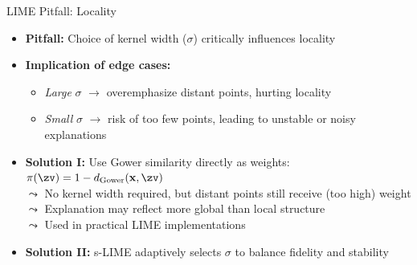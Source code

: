 \documentclass[10pt,compress,t,notes=noshow, xcolor=table]{beamer}
\begin{document}
\begin{frame}{LIME Pitfall: Locality }

\begin{itemize}
  \item \textbf{Pitfall:} Choice of kernel width (\(\sigma\)) critically influences locality
  \pause
  \item \textbf{Implication of edge cases:}
  \begin{itemize}
    \item \emph{Large} $\sigma$ $\rightarrow$ overemphasize distant points, hurting locality
    \item \emph{Small} $\sigma$ $\rightarrow$ risk of too few points, leading to unstable or noisy explanations
  \end{itemize}
  \pause
  \item  \textbf{Solution I:} Use Gower similarity directly as weights: \( \pi(\zv) = 1 - d_{\text{Gower}}(\xv, \zv) \)\\
  $\leadsto$ No kernel width required, but distant points still receive (too high) weight\\
  $\leadsto$ Explanation may reflect more global than local structure\\
  $\leadsto$ Used in practical LIME implementations 
  \pause
  \item \textbf{Solution II:} s-LIME adaptively selects \(\sigma\) to balance fidelity and stability 
\end{itemize}
\end{frame}
\end{document}
